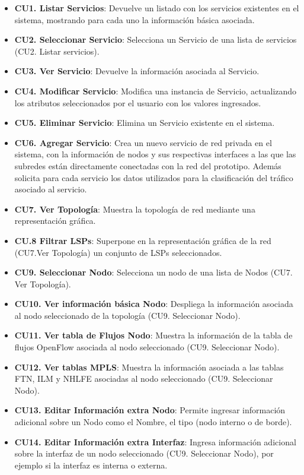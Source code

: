 \begin{itemize}
\item \textbf{CU1. Listar Servicios}: Devuelve un listado con los servicios existentes en el sistema, mostrando para cada uno la informaci\'on b\'asica asociada.

\item \textbf{CU2. Seleccionar Servicio}: Selecciona un Servicio de una lista de servicios (CU2. Listar servicios).

\item \textbf{CU3. Ver Servicio}: Devuelve la informaci\'on asociada al Servicio.

\item \textbf{CU4. Modificar Servicio}: Modifica una instancia de Servicio, actualizando los atributos seleccionados por el usuario con los valores ingresados.
 								
\item \textbf{CU5. Eliminar Servicio}: Elimina un Servicio existente en el sistema.

\item \textbf{CU6. Agregar Servicio}: Crea un nuevo servicio de red privada en el sistema, con la informaci\'on de nodos y sus respectivas interfaces a las que las subredes est\'an directamente conectadas con la red del prototipo. Adem\'as solicita para cada servicio los datos utilizados para la clasificaci\'on del tr\'afico asociado al servicio. 

\item \textbf{CU7. Ver Topolog\'ia}: Muestra la topolog\'ia de red mediante una representaci\'on gr\'afica.

\item \textbf{CU.8 Filtrar LSPs}: Superpone en la representaci\'on gr\'afica de la red (CU7.Ver Topolog\'ia) un conjunto de LSPs seleccionados.

\item \textbf{CU9. Seleccionar Nodo}: Selecciona un nodo de una lista de Nodos (CU7. Ver Topolog\'ia).

\item \textbf{CU10. Ver informaci\'on b\'asica Nodo}: Despliega la informaci\'on asociada al nodo seleccionado de la topolog\'ia (CU9. Seleccionar Nodo).

\item \textbf{CU11. Ver tabla de Flujos Nodo}: Muestra la informaci\'on de la tabla de flujos OpenFlow asociada al nodo seleccionado (CU9. Seleccionar Nodo).

\item \textbf{CU12. Ver tablas MPLS}: Muestra la informaci\'on asociada a las tablas FTN, ILM y NHLFE asociadas al nodo seleccionado (CU9. Seleccionar Nodo).

\item \textbf{CU13. Editar Informaci\'on extra Nodo}: Permite ingresar informaci\'on adicional sobre un Nodo como el Nombre, el tipo (nodo interno o de borde).

\item \textbf{CU14. Editar Informaci\'on extra Interfaz}: Ingresa informaci\'on adicional sobre la interfaz de un nodo seleccionado (CU9. Seleccionar Nodo), por ejemplo si la interfaz es interna o externa.
\end{itemize}

